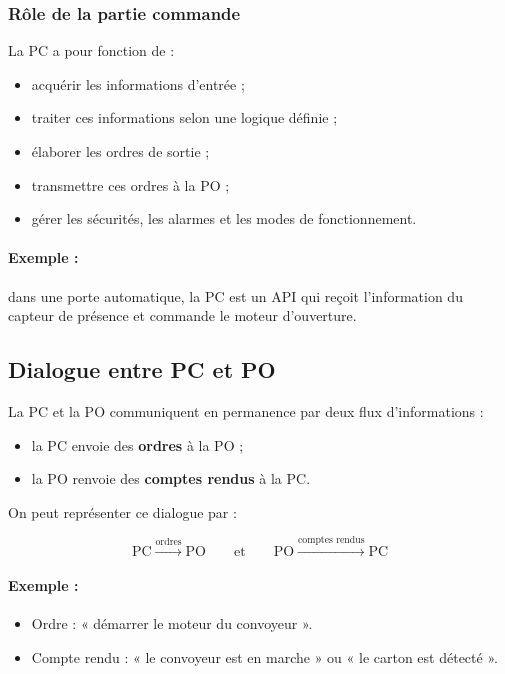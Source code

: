 \subsubsection{Rôle de la partie commande}

La PC a pour fonction de :

\begin{itemize}
    \item acquérir les informations d'entrée ;
    \item traiter ces informations selon une logique définie ;
    \item élaborer les ordres de sortie ;
    \item transmettre ces ordres à la PO ;
    \item gérer les sécurités, les alarmes et les modes de fonctionnement.
\end{itemize}

\paragraph{Exemple :} dans une porte automatique, la PC est un API qui reçoit l'information du capteur de présence et commande le moteur d'ouverture.

\subsection{Dialogue entre PC et PO}

La PC et la PO communiquent en permanence par deux flux d'informations :

\begin{itemize}
    \item la PC envoie des \textbf{ordres} à la PO ;
    \item la PO renvoie des \textbf{comptes rendus} à la PC.
\end{itemize}

On peut représenter ce dialogue par :

\[
\text{PC} \xrightarrow{\text{ordres}} \text{PO}
\qquad \text{et} \qquad
\text{PO} \xrightarrow{\text{comptes rendus}} \text{PC}
\]

\paragraph{Exemple :}

\begin{itemize}
    \item Ordre : « démarrer le moteur du convoyeur ».
    \item Compte rendu : « le convoyeur est en marche » ou « le carton est détecté ».
\end{itemize}


